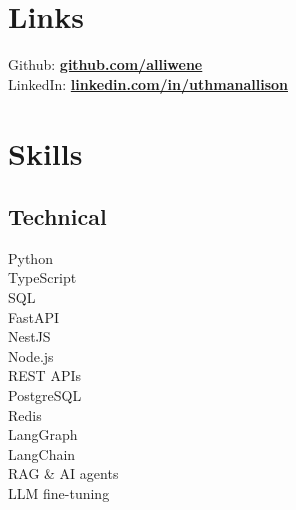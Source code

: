 \documentclass[letterpaper]{deedy-resume} %
\begin{document}
\begin{minipage}[t]{0.33\textwidth} %



\section{Links} 
Github: \href{https://github.com/alliwene}{\bf github.com/alliwene} \\
LinkedIn: \href{https://www.linkedin.com/in/uthmanallison}{\bf linkedin.com/in/uthmanallison} \\

\sectionspace %




\section{Skills}

\subsection{Technical}
Python \\
TypeScript \\
SQL \\
FastAPI \\
NestJS \\
Node.js \\
REST APIs \\
PostgreSQL \\
Redis \\
LangGraph \\
LangChain \\
RAG \& AI agents \\
LLM fine-tuning

\sectionspace %



\end{minipage}
\end{document}
